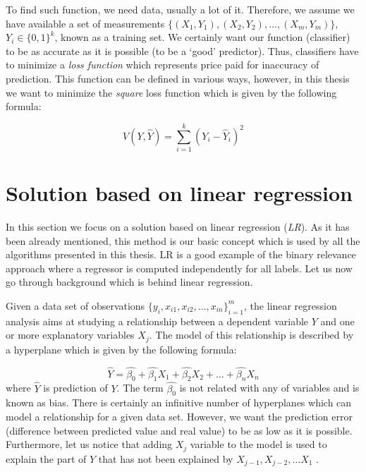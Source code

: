 \documentclass[english,a4paper,twoside]{ppfcmthesis}
\begin{document}
To find such function, we need data, usually a lot of it. Therefore, we assume we have available a set of measurements $\{(X_1, Y_1), (X_2, Y_2), \ldots, (X_m, Y_m)\}$, $Y_i\in\{0,1\}^k$, known as a training set. We certainly want our function (classifier) to be as accurate as it is possible (to be a `good' predictor). Thus, classifiers have to minimize a \textit{loss function} which represents price paid for inaccuracy of prediction. This function can be defined in various ways, however, in this thesis we want to minimize the \textit{square} loss function which is given by the following formula:

\begin{equation}\label{eq:def}
    V(Y,\hat{Y})= \sum\limits_{i=1}^{k}(Y_{i}-\hat{Y}_{i})^2
\end{equation}


\section{Solution based on linear regression}\label{sec:lr}

In this section we focus on a solution based on linear regression (\textit{LR}). As it has been already mentioned, this method is our basic concept which is used by all the algorithms presented in this thesis. LR is a good example of the binary relevance approach where a regressor is computed independently for all labels. Let us now go through background which is behind linear regression. 

Given a data set of observations $\{y_i, x_{i1}, x_{i2}, \ldots, x_{in}\}_{i=1}^{m}$, the linear regression analysis aims at studying a relationship between a dependent variable $Y$ and one or more explanatory variables $X_{j}$. The model of this relationship is described by a hyperplane which is given by the following formula:

\begin{equation}\label{eq:LR1}
    \hat{Y} = \hat{\beta_0} + \hat{\beta_1}X_{1} + \hat{\beta_2}X_{2} + \dots + \hat{\beta_n}X_{n}
\end{equation}
where $\hat{Y}$ is prediction of $Y$. The term $\hat{\beta_0}$ is not related with any of variables and is known as bias. 
There is certainly an infinitive number of hyperplanes which can model a relationship for a given data set. However, we want the prediction error (difference between predicted value and real value) to be as low as it is possible. Furthermore, let us notice that adding $X_j$ variable to the model is used to explain the part of $Y$ that has not been explained by $X_{j-1}, X_{j-2}, \ldots X_1$ \citep{Weisberg}.
\end{document}

